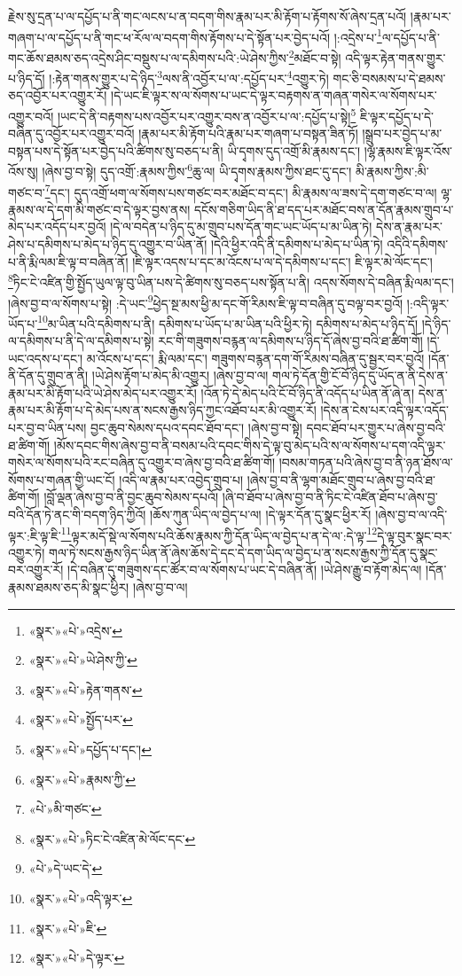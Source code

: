 རྗེས་སུ་དྲན་པ་ལ་དཔྱོད་པ་ནི་གང་ལངས་པ་ན་བདག་གིས་རྣམ་པར་མི་རྟོག་པ་རྟོགས་སོ་ཞེས་དྲན་པའོ། །རྣམ་པར་གཞག་པ་ལ་དཔྱོད་པ་ནི་གང་ཕ་རོལ་ལ་བདག་གིས་རྟོགས་པ་དེ་སྟོན་པར་བྱེད་པའོ། །:འདྲེས་པ་\footnote{«སྣར་»«པེ་»འདྲེས་}ལ་དཔྱོད་པ་ནི་གང་ཆོས་ཐམས་ཅད་འདྲེས་ཤིང་བསྡུས་པ་ལ་དམིགས་པའི་:ཡེ་ཤེས་ཀྱིས་\footnote{«སྣར་»«པེ་»ཡེ་ཤེས་ཀྱི་}མཐོང་བ་སྟེ། འདི་ལྟར་རྟེན་གནས་གྱུར་པ་ཉིད་དོ། །:རྟེན་གནས་གྱུར་པ་དེ་ཉིད་\footnote{«སྣར་»«པེ་»རྟེན་གནས་}ལས་ནི་འབྱོར་པ་ལ་:དཔྱོད་པར་\footnote{«སྣར་»«པེ་»སྤྱོད་པར་}འགྱུར་ཏེ། གང་ཅི་བསམས་པ་དེ་ཐམས་ཅད་འབྱོར་པར་འགྱུར་རོ། །དེ་ཡང་ཇི་ལྟར་ས་ལ་སོགས་པ་ཡང་དེ་ལྟར་བརྟགས་ན་གཞན་གསེར་ལ་སོགས་པར་འགྱུར་བའོ། །ཡང་དེ་ནི་བརྟགས་པས་འབྱོར་པར་འགྱུར་བས་ན་འབྱོར་པ་ལ་:དཔྱོད་པ་སྟེ།\footnote{«སྣར་»«པེ་»དཔྱོད་པ་དང་།} ཇི་ལྟར་དཔྱོད་པ་དེ་བཞིན་དུ་འབྱོར་པར་འགྱུར་བའོ། །རྣམ་པར་མི་རྟོག་པའི་རྣམ་པར་གཞག་པ་བསྟན་ཟིན་ཏོ། །སྒྲུབ་པར་བྱེད་པ་མ་བསྟན་པས་དེ་སྟོན་པར་བྱེད་པའི་ཚིགས་སུ་བཅད་པ་ནི། ཡི་དྭགས་དུད་འགྲོ་མི་རྣམས་དང་། །ལྷ་རྣམས་ཇི་ལྟར་འོས་འོས་སུ། །ཞེས་བྱ་བ་སྟེ། དུད་འགྲོ་:རྣམས་ཀྱིས་\footnote{«སྣར་»«པེ་»རྣམས་ཀྱི་}ཆུ་ལ། ཡི་དྭགས་རྣམས་ཀྱིས་ཐང་དུ་དང་། མི་རྣམས་ཀྱིས་:མི་གཙང་བ་\footnote{«པེ་»མི་གཙང་}དང་། དུད་འགྲོ་ཕག་ལ་སོགས་པས་གཙང་བར་མཐོང་བ་དང་། མི་རྣམས་ལ་ཟས་དེ་དག་གཙང་བ་ལ། ལྷ་རྣམས་ལ་དེ་དག་མི་གཙང་བ་དེ་ལྟར་བྱས་ནས། དངོས་གཅིག་ཡིད་ནི་ཐ་དད་པར་མཐོང་བས་ན་དོན་རྣམས་གྲུབ་པ་མེད་པར་འདོད་པར་བྱའོ། །དེ་ལ་བདེན་པ་ཉིད་དུ་མ་གྲུབ་པས་དོན་གང་ཡང་ཡོད་པ་མ་ཡིན་ཏེ། དེས་ན་རྣམ་པར་ཤེས་པ་དམིགས་པ་མེད་པ་ཉིད་དུ་འགྱུར་བ་ཡིན་ནོ། །དེའི་ཕྱིར་འདི་ནི་དམིགས་པ་མེད་པ་ཡིན་ཏེ། འདིའི་དམིགས་པ་ནི་རྨི་ལམ་ཇི་ལྟ་བ་བཞིན་ནོ། །ཇི་ལྟར་འདས་པ་དང་མ་འོངས་པ་ལ་དེ་དམིགས་པ་དང་། ཇི་ལྟར་མེ་ལོང་དང་། \footnote{«སྣར་»«པེ་»ཏིང་ངེ་འཛིན་མེ་ལོང་དང་}ཏིང་ངེ་འཛིན་གྱི་སྤྱོད་ཡུལ་ལྟ་བུ་ཡིན་པས་དེ་ཚིགས་སུ་བཅད་པས་སྟོན་པ་ནི། འདས་སོགས་དེ་བཞིན་རྨི་ལམ་དང་། །ཞེས་བྱ་བ་ལ་སོགས་པ་སྟེ། :དེ་ཡང་\footnote{«པེ་»དེ་ཡང་དེ་}ཕྱེད་སྔ་མས་ཕྱི་མ་དང་གོ་རིམས་ཇི་ལྟ་བ་བཞིན་དུ་བལྟ་བར་བྱའོ། །:འདི་ལྟར་ཡོད་པ་\footnote{«སྣར་»«པེ་»འདི་ལྟར་}མ་ཡིན་པའི་དམིགས་པ་ནི། དམིགས་པ་ཡོད་པ་མ་ཡིན་པའི་ཕྱིར་ཏེ། དམིགས་པ་མེད་པ་ཉིད་དོ། །དེ་ཉིད་ལ་དམིགས་པ་ནི་དེ་ལ་དམིགས་པ་སྟེ། རང་གི་གཟུགས་བརྙན་ལ་དམིགས་པ་ཉིད་དོ་ཞེས་བྱ་བའི་ཐ་ཚིག་གོ། །དེ་ཡང་འདས་པ་དང་། མ་འོངས་པ་དང་། རྨི་ལམ་དང་། གཟུགས་བརྙན་དག་གོ་རིམས་བཞིན་དུ་སྦྱར་བར་བྱའོ། །དོན་ནི་དོན་དུ་གྲུབ་ན་ནི། །ཡེ་ཤེས་རྟོག་པ་མེད་མི་འགྱུར། །ཞེས་བྱ་བ་ལ། གལ་ཏེ་དོན་གྱི་ངོ་བོ་ཉིད་དུ་ཡོད་ན་ནི་དེས་ན་རྣམ་པར་མི་རྟོག་པའི་ཡེ་ཤེས་མེད་པར་འགྱུར་རོ། །འོན་ཏེ་དེ་མེད་པའི་ངོ་བོ་ཉིད་ནི་འདོད་པ་ཡིན་ནོ་ཞེ་ན། དེས་ན་རྣམ་པར་མི་རྟོག་པ་དེ་མེད་པས་ན་སངས་རྒྱས་ཉིད་ཀྱང་འཐོབ་པར་མི་འགྱུར་རོ། །དེས་ན་ངེས་པར་འདི་ལྟར་འདོད་པར་བྱ་བ་ཡིན་པས། བྱང་ཆུབ་སེམས་དཔའ་དབང་ཐོབ་དང་། །ཞེས་བྱ་བ་སྟེ། དབང་ཐོབ་པར་གྱུར་པ་ཞེས་བྱ་བའི་ཐ་ཚིག་གོ། །མོས་དབང་གིས་ཞེས་བྱ་བ་ནི་བསམ་པའི་དབང་གིས་དེ་ལྟ་བུ་མེད་པའི་ས་ལ་སོགས་པ་དག་འདི་ལྟར་གསེར་ལ་སོགས་པའི་རང་བཞིན་དུ་འགྱུར་བ་ཞེས་བྱ་བའི་ཐ་ཚིག་གོ། །བསམ་གཏན་པའི་ཞེས་བྱ་བ་ནི་ཉན་ཐོས་ལ་སོགས་པ་གཞན་གྱི་ཡང་ངོ། །འདི་ལ་རྣམ་པར་འབྱེད་གྲུབ་པ། །ཞེས་བྱ་བ་ནི་ལྷག་མཐོང་གྲུབ་པ་ཞེས་བྱ་བའི་ཐ་ཚིག་གོ། །བློ་ལྡན་ཞེས་བྱ་བ་ནི་བྱང་ཆུབ་སེམས་དཔའོ། །ཞི་བ་ཐོབ་པ་ཞེས་བྱ་བ་ནི་ཏིང་ངེ་འཛིན་ཐོབ་པ་ཞེས་བྱ་བའི་དོན་ཏེ་ནང་གི་བདག་ཉིད་ཀྱིའོ། །ཆོས་ཀུན་ཡིད་ལ་བྱེད་པ་ལ། །དེ་ལྟར་དོན་དུ་སྣང་ཕྱིར་རོ། །ཞེས་བྱ་བ་ལ་འདི་ལྟར་:ཇི་ལྟ་ཇི་\footnote{«སྣར་»«པེ་»ཇི་}ལྟར་མདོ་སྡེ་ལ་སོགས་པའི་ཆོས་རྣམས་ཀྱི་དོན་ཡིད་ལ་བྱེད་པ་ན་དེ་ལ་:དེ་ལྟ་\footnote{«སྣར་»«པེ་»དེ་ལྟར་}དེ་ལྟ་བུར་སྣང་བར་འགྱུར་ཏེ། གལ་ཏེ་སངས་རྒྱས་ཉིད་ཡིན་ནོ་ཞེས་ཆོས་དེ་དང་དེ་དག་ཡིད་ལ་བྱེད་པ་ན་སངས་རྒྱས་ཀྱི་དོན་དུ་སྣང་བར་འགྱུར་རོ། །དེ་བཞིན་དུ་གཟུགས་དང་ཚོར་བ་ལ་སོགས་པ་ཡང་དེ་བཞིན་ནོ། །ཡེ་ཤེས་རྒྱུ་བ་རྟོག་མེད་ལ། །དོན་རྣམས་ཐམས་ཅད་མི་སྣང་ཕྱིར། །ཞེས་བྱ་བ་ལ། 